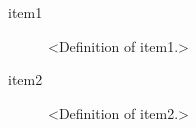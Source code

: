 
% 
%
%
%

\begin{description}

\item [item1] \label{glos:item1} <Definition of item1.>

\item [item2] \label{glos:item2} <Definition of item2.>

\end{description}








